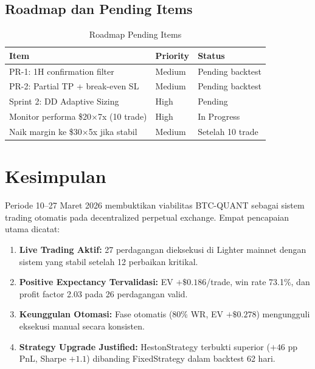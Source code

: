 \documentclass[10pt,a4paper]{article}
\begin{document}
\newpage
\subsection{Roadmap dan Pending Items}
\label{subsec:roadmap}

\begin{table}[ht]
\caption{Roadmap Pending Items}
\label{tab:roadmap}
\centering
\small
\begin{tabular}{llp{3.5cm}}
\toprule
\textbf{Item} & \textbf{Priority} & \textbf{Status} \\
\midrule
PR-1: 1H confirmation filter        & Medium & Pending backtest \\
PR-2: Partial TP + break-even SL    & Medium & Pending backtest \\
Sprint 2: DD Adaptive Sizing        & High   & Pending \\
Monitor performa \$20$\times$7x (10 trade) & High & In Progress \\
Naik margin ke \$30$\times$5x jika stabil & Medium & Setelah 10 trade \\
\bottomrule
\end{tabular}
\end{table}

\section{Kesimpulan}
\label{sec:conclusion}

Periode 10--27 Maret 2026 membuktikan viabilitas BTC-QUANT sebagai sistem trading
otomatis pada decentralized perpetual exchange. Empat pencapaian utama dicatat:

\begin{enumerate}
    \item \textbf{Live Trading Aktif:} 27 perdagangan dieksekusi di Lighter mainnet
          dengan sistem yang stabil setelah 12 perbaikan kritikal.
    \item \textbf{Positive Expectancy Tervalidasi:} EV $+\$0.186$/trade, win rate
          73.1\%, dan profit factor 2.03 pada 26 perdagangan valid.
    \item \textbf{Keunggulan Otomasi:} Fase otomatis (80\% WR, EV $+\$0.278$)
          mengungguli eksekusi manual secara konsisten.
    \item \textbf{Strategy Upgrade Justified:} HestonStrategy terbukti superior
          ($+46$ pp PnL, Sharpe $+1.1$) dibanding FixedStrategy dalam backtest 62 hari.
\end{enumerate}
\end{document}
